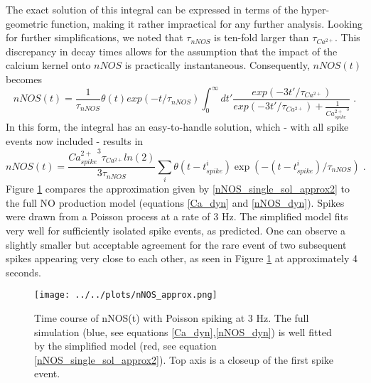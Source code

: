\documentclass[10pt,a4paper]{article}
\begin{document}
The exact solution of this integral can be expressed in terms of the hyper-geometric function, making it rather impractical for any further analysis. Looking for further simplifications, we noted that $\tau_{nNOS}$ is ten-fold larger than $\tau_{Ca^{2+}}$. This discrepancy in decay times allows for the assumption that the impact of the calcium kernel onto $nNOS$ is practically instantaneous. Consequently, $nNOS(t)$ becomes
\begin{equation}
nNOS(t) = \frac{1}{\tau_{nNOS}} \theta(t) exp(-t/\tau_{nNOS}) \int_{0}^\infty dt' \frac{exp(-3t'/\tau_{Ca^{2+}})}{exp(-3t'/\tau_{Ca^{2+}}) + \frac{1}{{Ca^{2+}_{spike}}^3}}\;.
\label{nNOS_single_sol_approx1}
\end{equation}
In this form, the integral has an easy-to-handle solution, which - with all spike events now included - results in
\begin{equation}
nNOS(t) = \frac{{Ca^{2+}_{spike}}^3 \tau_{Ca^{2+}}ln(2)}{3\tau_{nNOS}} \sum_i \theta(t-t^i_{spike}) \exp(-(t-t^i_{spike})/\tau_{nNOS})\;.
\label{nNOS_single_sol_approx2}
\end{equation}
Figure \ref{nNOS_approx_plot} compares the approximation given by \eqref{nNOS_single_sol_approx2} to the full NO production model (equations \eqref{Ca_dyn} and \eqref{nNOS_dyn}). Spikes were drawn from a Poisson process at a rate of 3 Hz. The simplified model fits very well for sufficiently isolated spike events, as predicted. One can observe a slightly smaller but acceptable agreement for the rare event of two subsequent spikes appearing very close to each other, as seen in Figure \ref{nNOS_approx_plot} at approximately 4 seconds.
\begin{figure}
\texttt{[image: ../../plots/nNOS\_approx.png]}
\caption{Time course of nNOS(t) with Poisson spiking at 3 Hz. The full simulation (blue, see equations \eqref{Ca_dyn},\eqref{nNOS_dyn}) is well fitted by the simplified model (red, see equation \eqref{nNOS_single_sol_approx2}). Top axis is a closeup of the first spike event.}
\label{nNOS_approx_plot}
\end{figure}
\end{document}
